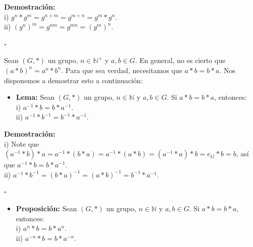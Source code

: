 \documentclass[10 pt]{article}
\begin{document}
\Large{\textbf{Demostración:} \\

i) $g^{n}*g^{m}=g^{n+m}=g^{m+n}=g^{m}*g^n$. \\

ii) $(g^{n})^m=g^{nm}=g^{mn}=(g^m)^n$.}\\

\begin{flushright}
    $\square$
\end{flushright}

\Large{Sean $(G,*)$ un grupo, $n \in \mathbb N^+$ y $a,b \in G$. En general, no es cierto que $(a*b)^{n}=a^n*b^n$. Para que sea verdad, necesitamos que $a*b=b*a$. Nos disponemos a demostrar esto a continuación:} \\

\begin{itemize}
    \item \Large{\textbf{Lema:} Sean $(G,*)$ un grupo, $n \in \mathbb N$ y $a,b \in G$. Si $a*b=b*a$, entonces: \\

    i) $a^{-1}*b=b*a^{-1}$. \\

    ii) $a^{-1}*b^{-1}=b^{-1}*a^{-1}$.} \\
\end{itemize}

\Large{\textbf{Demostración:} \\

i) Note que $(a^{-1}*b)*a=a^{-1}*(b*a)=a^{-1}*(a*b)=(a^{-1}*a)*b=e_G*b=b$, así que $a^{-1}*b=b*a^{-1}$. \\

ii) $a^{-1}*b^{-1}=(b*a)^{-1}=(a*b)^{-1}=b^{-1}*a^{-1}$.} \\

\begin{flushright}
    $\square$
\end{flushright}

\begin{itemize}
    \item \Large{\textbf{Proposición:} Sean $(G,*)$ un grupo, $n \in \mathbb N$ y $a,b \in G$. Si $a*b=b*a$, entonces: \\

    i) $a^n*b=b*a^n$. \\

    ii) $a^{-n}*b=b*a^{-n}$.} \\
\end{itemize}
\end{document}
